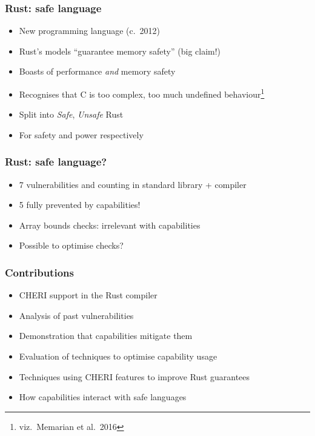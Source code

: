 \documentclass{beamer}
\begin{document}
\begin{frame}
\frametitle{Rust: safe language}

\begin{itemize}
    \item New programming language (c.\ 2012)
    \item Rust's models ``guarantee memory safety'' (big claim!)
    \item Boasts of performance \emph{and} memory safety
    \item Recognises that C is too complex, too much undefined behaviour\footnote{viz.\ Memarian et al.\ 2016}
    \item Split into \emph{Safe}, \emph{Unsafe} Rust
    \item For safety and power respectively
\end{itemize}
\end{frame}


\begin{frame}
\frametitle{Rust: safe language?}

\begin{itemize}
    \item 7 vulnerabilities and counting in standard library + compiler
    \item 5 fully prevented by capabilities!
    \item Array bounds checks: irrelevant with capabilities
    \item Possible to optimise checks?
\end{itemize}
\end{frame}


\begin{frame}
\frametitle{Contributions}

\begin{itemize}
    \item CHERI support in the Rust compiler
    \item Analysis of past vulnerabilities
    \item Demonstration that capabilities mitigate them
    \item Evaluation of techniques to optimise capability usage
    \item Techniques using CHERI features to improve Rust guarantees
    \item How capabilities interact with safe languages
\end{itemize}
\end{frame}
\end{document}
